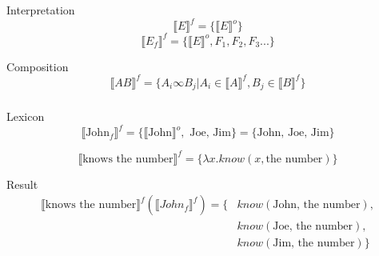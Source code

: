 \documentclass[compress]{beamer}
\newcommand{\la}{\ensuremath{\lambda}}
\newcommand{\inter}[1]{\ensuremath{\llbracket#1\rrbracket}}
\begin{document}
% 
\begin{frame}
\frametitle{\cite{eckardt2006}\small{\cite{krifka1995polarity}}}
      \begin{block}{Interpretation}
     \begin{equation}
          \inter{E}^f = \{\inter{E}^o\}
     \end{equation}
     \begin{equation}
	  \inter{E_f}^f = \{\inter{E}^o, F_1, F_2, F_3...\}
     \end{equation}         
      \end{block}

      \begin{block}{Composition}
      \begin{equation}
          \inter{AB}^f = \{ A_i \infty B_j | A_i \in \inter{A}^f, B_j \in \inter{B}^f \}
      \end{equation}       
      \end{block}
\end{frame}

\begin{frame}
\frametitle{\cite{eckardt2006}}
    \begin{block}{Lexicon}
     \begin{equation}
	    \inter{\text{John}_f}^f = \{ \inter{\text{John}}^o,\text{ Joe, Jim}\} = \{ \text{John, Joe, Jim} \}
     \end{equation}

     \begin{equation}
	    \inter{\text{knows the number}}^f = \{ \la x . know(x, \text{the number}) \}
     \end{equation}
    \end{block}

    \begin{block}{Result}
     \begin{equation}
      \begin{split}
           \inter{\text{knows the number}}^f(\inter{John_f}^f) = \{& know(\text{John, the number}),\\& know(\text{Joe, the number}),\\& know(\text{Jim, the number}) \}
      \end{split}
     \end{equation}     
    \end{block}
\end{frame}
\end{document}
